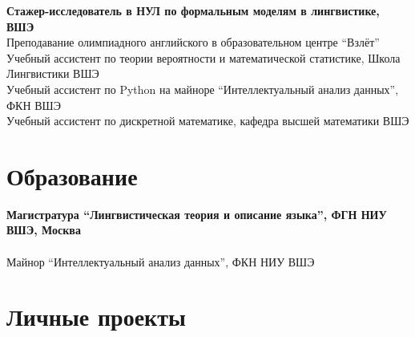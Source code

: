 \documentclass[11pt]{article} %
\begin{document}
	\vspace*{.5em}

 \textbf{Стажер-исследователь в НУЛ по формальным моделям в лингвистике, ВШЭ}\\
 Преподавание олимпиадного английского в образовательном центре ``Взлёт''\\
 Учебный ассистент по теории вероятности и математической статистике, Школа Лингвистики ВШЭ\\
 Учебный ассистент по Python на майноре ``Интеллектуальный анализ данных'', ФКН ВШЭ\\
 Учебный ассистент по дискретной математике, кафедра высшей математики ВШЭ


\section*{Образование}

\textbf{Магистратура ``Лингвистическая теория и описание языка'', ФГН НИУ ВШЭ, Москва}\\
\\
 Майнор ``Интеллектуальный анализ данных'', ФКН НИУ ВШЭ

\section*{Личные проекты}
\end{document}
